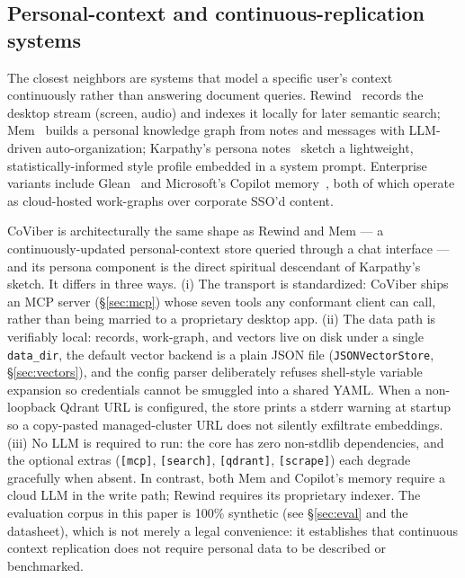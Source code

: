 \subsection{Personal-context and continuous-replication systems}
\label{sec:related:personal}

The closest neighbors are systems that model a specific user's context continuously rather than answering document queries. Rewind~\cite{TODO-rewind} records the desktop stream (screen, audio) and indexes it locally for later semantic search; Mem~\cite{TODO-mem-ai} builds a personal knowledge graph from notes and messages with LLM-driven auto-organization; Karpathy's persona notes~\cite{TODO-karpathy-persona} sketch a lightweight, statistically-informed style profile embedded in a system prompt. Enterprise variants include Glean~\cite{TODO-glean} and Microsoft's Copilot memory~\cite{TODO-copilot-memory}, both of which operate as cloud-hosted work-graphs over corporate SSO'd content.

CoViber is architecturally the same shape as Rewind and Mem --- a continuously-updated personal-context store queried through a chat interface --- and its persona component is the direct spiritual descendant of Karpathy's sketch. It differs in three ways. (i) The transport is standardized: CoViber ships an MCP server (\S\ref{sec:mcp}) whose seven tools any conformant client can call, rather than being married to a proprietary desktop app. (ii) The data path is verifiably local: records, work-graph, and vectors live on disk under a single \texttt{data\_dir}, the default vector backend is a plain JSON file (\texttt{JSONVectorStore}, \S\ref{sec:vectors}), and the config parser deliberately refuses shell-style variable expansion so credentials cannot be smuggled into a shared YAML. When a non-loopback Qdrant URL is configured, the store prints a stderr warning at startup so a copy-pasted managed-cluster URL does not silently exfiltrate embeddings. (iii) No LLM is required to run: the core has zero non-stdlib dependencies, and the optional extras (\texttt{[mcp]}, \texttt{[search]}, \texttt{[qdrant]}, \texttt{[scrape]}) each degrade gracefully when absent. In contrast, both Mem and Copilot's memory require a cloud LLM in the write path; Rewind requires its proprietary indexer. The evaluation corpus in this paper is 100\% synthetic (see \S\ref{sec:eval} and the datasheet), which is not merely a legal convenience: it establishes that continuous context replication does not require personal data to be described or benchmarked.

